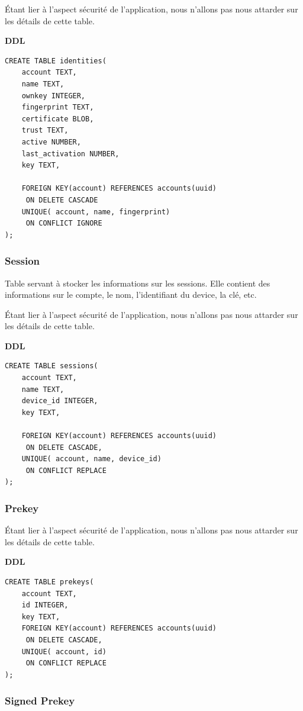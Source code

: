 \documentclass[a4paper,11pt]{article}
\begin{document}
Étant lier à l'aspect sécurité de l'application, nous n'allons pas nous attarder sur les détails de cette table.

\textbf{DDL}
\begin{lstlisting}
CREATE TABLE identities(
    account TEXT,
    name TEXT,
    ownkey INTEGER,
    fingerprint TEXT,
    certificate BLOB,
    trust TEXT,
    active NUMBER,
    last_activation NUMBER,
    key TEXT,
    
    FOREIGN KEY(account) REFERENCES accounts(uuid)
     ON DELETE CASCADE
    UNIQUE( account, name, fingerprint)
     ON CONFLICT IGNORE
);
\end{lstlisting}
\subsubsection{Session}

Table servant à stocker les informations sur les sessions. Elle contient des informations sur le compte, le nom, l'identifiant du device, la clé, etc.

Étant lier à l'aspect sécurité de l'application, nous n'allons pas nous attarder sur les détails de cette table.

\textbf{DDL}
\begin{lstlisting}
CREATE TABLE sessions(
    account TEXT,
    name TEXT,
    device_id INTEGER,
    key TEXT,
    
    FOREIGN KEY(account) REFERENCES accounts(uuid)
     ON DELETE CASCADE,
    UNIQUE( account, name, device_id)
     ON CONFLICT REPLACE
);
\end{lstlisting}
\subsubsection{Prekey}

Étant lier à l'aspect sécurité de l'application, nous n'allons pas nous attarder sur les détails de cette table.

\textbf{DDL}
\begin{lstlisting}
CREATE TABLE prekeys(
    account TEXT,
    id INTEGER,
    key TEXT,
    FOREIGN KEY(account) REFERENCES accounts(uuid)
     ON DELETE CASCADE,
    UNIQUE( account, id)
     ON CONFLICT REPLACE
);
\end{lstlisting}
\subsubsection{Signed Prekey}
\end{document}
